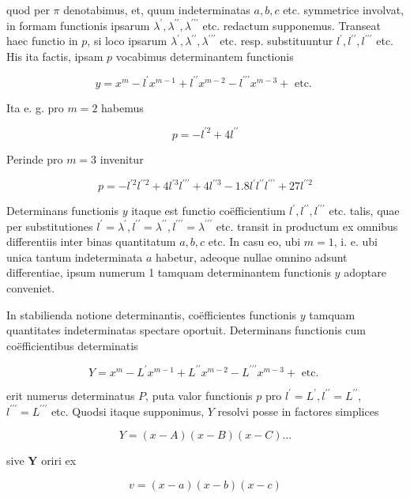 \documentclass[10pt]{article}
\begin{document}
quod per \(\pi\) denotabimus, et, quum indeterminatas \(a, b, c\) etc. symmetrice involvat, in formam functionis ipsarum \(\lambda^{\prime}, \lambda^{\prime \prime}, \lambda^{\prime \prime \prime}\) etc. redactum supponemus. Transeat haec functio in \(p\), si loco ipsarum \(\lambda^{\prime}, \lambda^{\prime \prime}, \lambda^{\prime \prime \prime}\) etc. resp. substituuntur \(l^{\prime}, l^{\prime \prime}, l^{\prime \prime \prime}\) etc. His ita factis, ipsam \(p\) vocabimus determinantem functionis

\[
y=x^{m}-l^{\prime} x^{m-1}+l^{\prime \prime} x^{m-2}-l^{\prime \prime \prime} x^{m-3}+\text { etc. }
\]

Ita e. g. pro \(m=2\) habemus

\[
p=-l^{\prime 2}+4 l^{\prime \prime}
\]

Perinde pro \(m=3\) invenitur

\[
p=-l^{\prime 2} l^{\prime \prime 2}+4 l^{\prime 3} l^{\prime \prime \prime}+4 l^{\prime \prime 3}-1.8 l^{\prime} l^{\prime \prime} l^{\prime \prime \prime}+27 l^{\prime \prime 2}
\]

Determinans functionis \(y\) itaque est functio coëfficientium \(l^{\prime}, l^{\prime \prime}, l^{\prime \prime \prime}\) etc. talis, quae per substitutiones \(l^{\prime}=\lambda^{\prime}, l^{\prime \prime}=\lambda^{\prime \prime}, l^{\prime \prime \prime}=\lambda^{\prime \prime \prime}\) etc. transit in productum ex omnibus differentiis inter binas quantitatum \(a, b, c\) etc. In casu eo, ubi \(m=1\), i. e. ubi unica tantum indeterminata \(a\) habetur, adeoque nullae omnino adsunt differentiae, ipsum numerum 1 tamquam determinantem functionis \(y\) adoptare conveniet.

In stabilienda notione determinantis, coëfficientes functionis \(y\) tamquam quantitates indeterminatas spectare oportuit. Determinans functionis cum coëfficientibus determinatis

\[
Y=x^{m}-L^{\prime} x^{m-1}+L^{\prime \prime} x^{m-2}-L^{\prime \prime \prime} x^{m-3}+\text { etc. }
\]

erit numerus determinatus \(P\), puta valor functionis \(p\) pro \(l^{\prime}=L^{\prime}, l^{\prime \prime}=L^{\prime \prime}\), \(l^{\prime \prime \prime}=L^{\prime \prime \prime}\) etc. Quodsi itaque supponimus, \(Y\) resolvi posse in factores simplices

\[
Y=(x-A)(x-B)(x-C) \ldots
\]

sive \(\boldsymbol{Y}\) oriri ex

\[
v=(x-a)(x-b)(x-c)
\]
\end{document}
